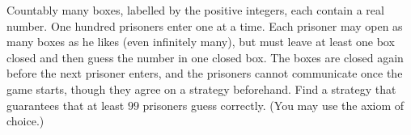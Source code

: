 Countably many boxes, labelled by the positive integers, each contain a real number. One hundred prisoners enter one at a time. Each prisoner may open as many boxes as he likes (even infinitely many), but must leave at least one box closed and then guess the number in one closed box. The boxes are closed again before the next prisoner enters, and the prisoners cannot communicate once the game starts, though they agree on a strategy beforehand. Find a strategy that guarantees that at least $99$ prisoners guess correctly. (You may use the axiom of choice.)
